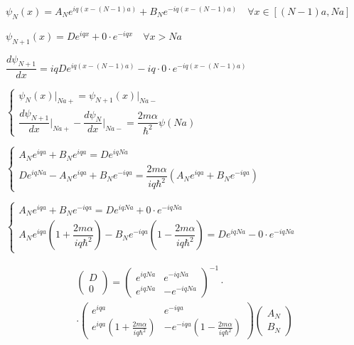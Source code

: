 \documentclass[a4paper, 12pt]{article}
\begin{document}
	\begin{center}
		$\psi_N (x) = A_N e^{iq(x-(N-1)a)} + B_N e^{-iq(x - (N-1)a)} \quad \forall x \in [(N-1)a, Na] $
		
		$\psi_{N+1} (x) = D e^{iqx} + 0\cdot e^{-iqx} \quad \forall x > Na$
		
		$\dfrac{d\psi_{N+1}}{dx} = iqDe^{iq(x - (N-1)a)} - iq\cdot 0 \cdot e^{-iq(x-(N-1)a)}$
		
		$\begin{cases}
			\psi_N (x) \bigg|_{Na+} = \psi_{N+1} (x) \bigg|_{Na-} \\ 
			\dfrac{d\psi_{N+1}}{dx}\bigg|_{Na+} - \dfrac{d\psi_{N}}{dx}\bigg|_{Na-} = \dfrac{2m\alpha}{\hbar^2} \psi(Na)
		\end{cases}$
		
		$\begin{cases}
			A_N e^{iqa} + B_N e^{iqa} = De^{iqNa} \\
			De^{iqNa} - A_N e^{iqa} + B_N e^{-iqa} = \dfrac{2m\alpha}{iq\hbar^2} (A_N e^{iqa} + B_N e^{-iqa}) 
		\end{cases}$
		
		
		$\begin{cases} 
			A_N e^{iqa} + B_N e^{-iqa} = D e^{iqNa} + 0\cdot e^{-iqNa} \\
			A_N e^{iqa} \left(1+ \dfrac{2m\alpha}{iq\hbar^2} \right) - B_N e^{-iqa} \left(1 - \dfrac{2m\alpha}{iq\hbar^2}\right) = De^{iqNa} - 0 \cdot e^{-iqNa} 
		\end{cases}$
		
		\begin{multline*}
			\left(\begin{array}{c}
				D \\
				0
			\end{array}\right) = \left(\begin{array}{cc}
				e^{iqNa} & e^{-iqNa} \\
				e^{iqNa} & -e^{-iqNa} 
			\end{array}\right)^{-1} \cdot \\
			\cdot \left(\begin{array}{cc}
				e^{iqa} & e^{-iqa} \\
				e^{iqa} \left(1 + \frac{2m\alpha}{iq\hbar^2}\right) & -e^{-iqa}\left(1 - \frac{2m\alpha}{iq\hbar^2}\right) 
			\end{array}\right) \left(\begin{array}{c}
				A_N \\
				B_N
			\end{array}\right)
		\end{multline*}
	\end{center}
\end{document}
